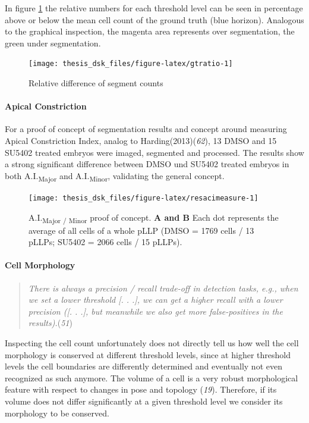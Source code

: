 \documentclass[11pt,singlespacinge,twoside]{reedthesis} %
\theoremstyle{definition}
\theoremstyle{definition}
\theoremstyle{definition}
\theoremstyle{remark}
\begin{document}
In figure \ref{fig:gtratio} the relative numbers for each threshold level can be seen in percentage above or below the mean cell count of the ground truth (blue horizon). Analogous to the graphical inspection, the magenta area represents over segmentation, the green under segmentation.


\begin{figure}[H]

{\centering \texttt{[image: thesis\_dsk\_files/figure-latex/gtratio-1]} 

}

\caption[Relative difference of segment counts]{Relative difference of segment counts}\label{fig:gtratio}
\end{figure}
\hypertarget{apical-constriction-2}{%
\paragraph{Apical Constriction}\label{apical-constriction-2}}

For a proof of concept of segmentation results and concept around measuring Apical Constriction Index, analog to Harding(2013)(\emph{62}), 13 DMSO and 15 SU5402 treated embryos were imaged, segmented and processed. The results show a strong significant difference between DMSO und SU5402 treated embryos in both A.I.\textsubscript{Major} and A.I.\textsubscript{Minor}, validating the general concept.


\begin{figure}

{\centering \texttt{[image: thesis\_dsk\_files/figure-latex/resacimeasure-1]} 

}

\caption[A.I. Major / Minor proof of concept]{A.I.\textsubscript{Major / Minor} proof of concept. \textbf{A and B} Each dot represents the average of all cells of a whole pLLP (DMSO = 1769 cells / 13 pLLPs; SU5402 = 2066 cells / 15 pLLPs).}\label{fig:resacimeasure}
\end{figure}
\hypertarget{cell-morphology}{%
\paragraph{Cell Morphology}\label{cell-morphology}}
\begin{quote}
\emph{There is always a precision / recall trade-off in detection tasks, e.g., when we set a lower threshold {[}. . .{]}, we can get a higher recall with a lower precision ({[}. . .{]}, but meanwhile we also get more false-positives in the results).}(\emph{51})
\end{quote}
Inspecting the cell count unfortunately does not directly tell us how well the cell morphology is conserved at different threshold levels, since at higher threshold levels the cell boundaries are differently determined and eventually not even recognized as such anymore. The volume of a cell is a very robust morphological feature with respect to changes in pose and topology (\emph{19}). Therefore, if its volume does not differ significantly at a given threshold level we consider its morphology to be conserved.
\end{document}

